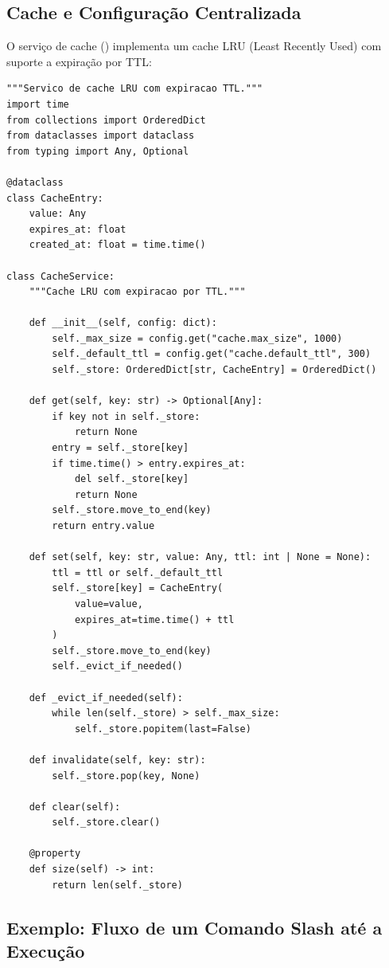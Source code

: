 \subsection{Cache e Configuração Centralizada}
\label{subsec:cache-config}

O serviço de cache () implementa um cache LRU
(Least Recently Used) com suporte a expiração por TTL:

\begin{lstlisting}[style=pythonstyle, caption={Servico de cache LRU},
                   label={lst:cache}]
"""Servico de cache LRU com expiracao TTL."""
import time
from collections import OrderedDict
from dataclasses import dataclass
from typing import Any, Optional

@dataclass
class CacheEntry:
    value: Any
    expires_at: float
    created_at: float = time.time()

class CacheService:
    """Cache LRU com expiracao por TTL."""

    def __init__(self, config: dict):
        self._max_size = config.get("cache.max_size", 1000)
        self._default_ttl = config.get("cache.default_ttl", 300)
        self._store: OrderedDict[str, CacheEntry] = OrderedDict()

    def get(self, key: str) -> Optional[Any]:
        if key not in self._store:
            return None
        entry = self._store[key]
        if time.time() > entry.expires_at:
            del self._store[key]
            return None
        self._store.move_to_end(key)
        return entry.value

    def set(self, key: str, value: Any, ttl: int | None = None):
        ttl = ttl or self._default_ttl
        self._store[key] = CacheEntry(
            value=value,
            expires_at=time.time() + ttl
        )
        self._store.move_to_end(key)
        self._evict_if_needed()

    def _evict_if_needed(self):
        while len(self._store) > self._max_size:
            self._store.popitem(last=False)

    def invalidate(self, key: str):
        self._store.pop(key, None)

    def clear(self):
        self._store.clear()

    @property
    def size(self) -> int:
        return len(self._store)
\end{lstlisting}

\subsection{Exemplo: Fluxo de um Comando Slash até a Execução}
\label{subsec:fluxo-comando}


